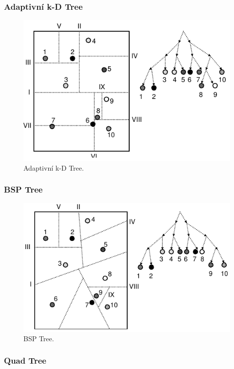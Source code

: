 \subsubsection{Adaptivní k-D Tree}


\begin{figure}[H]
    \centering
    \includegraphics[width=0.75\linewidth]{adaptivni_kd_tree.pdf}
    \caption{Adaptivní k-D Tree.}
\end{figure}

\subsubsection{BSP Tree}


\begin{figure}[H]
    \centering
    \includegraphics[width=0.75\linewidth]{bsp_tree.pdf}
    \caption{BSP Tree.}
\end{figure}

\subsubsection{Quad Tree}


